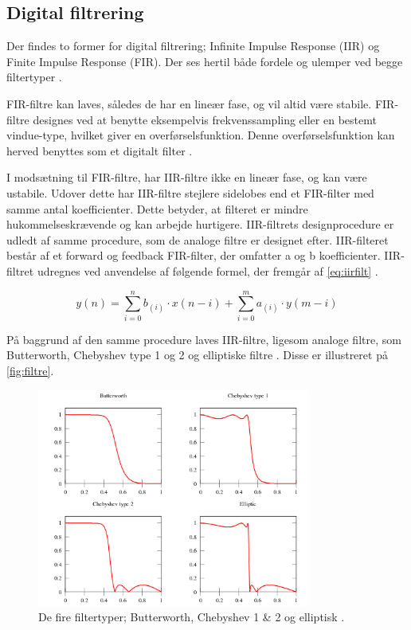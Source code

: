 \subsection{Digital filtrering} \label{sec:teori_filter}
Der findes to former for digital filtrering; Infinite Impulse Response (IIR) og Finite Impulse Response (FIR). Der ses hertil både fordele og ulemper ved begge filtertyper \citep{blandford2012}.

FIR-filtre kan laves, således de har en lineær fase, og vil altid være stabile. FIR-filtre designes ved at benytte eksempelvis frekvenssampling eller en bestemt vindue-type, hvilket giver en overførselsfunktion. Denne overførselsfunktion kan herved benyttes som et digitalt filter \citep{blandford2012}. 

I modsætning til FIR-filtre, har IIR-filtre ikke en lineær fase, og kan være ustabile. Udover dette har IIR-filtre stejlere sidelobes end et FIR-filter med samme antal koefficienter. Dette betyder, at filteret er mindre hukommelseskrævende og kan arbejde hurtigere. IIR-filtrets designprocedure er udledt af samme procedure, som de analoge filtre er designet efter.
IIR-filteret består af et forward og feedback FIR-filter, der omfatter a og b koefficienter. IIR-filtret udregnes ved anvendelse af følgende formel, der fremgår af \autoref{eq:iirfilt} \citep{francis2009}. 

\begin{equation} \label{eq:iirfilt}
	y(n)= \sum_{i=0}^{n} b_{(i)} \cdot x(n-i)+ \sum^{m}_{i=0} a_{(i)} \cdot y(m-i)
\end{equation}


På baggrund af den samme procedure laves IIR-filtre, ligesom analoge filtre, som Butterworth, Chebyshev type 1 og 2 og elliptiske filtre \citep{blandford2012}. Disse er illustreret på \autoref{fig:filtre}.

\begin{figure}[H]
\centering
\includegraphics[width=0.8\textwidth]{figures/filtre}
\caption{De fire filtertyper; Butterworth, Chebyshev 1 \& 2 og elliptisk \citep{wikipedia2016}.}
\label{fig:filtre}
\end{figure}

